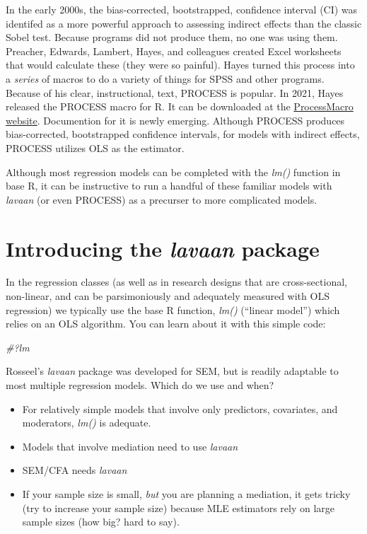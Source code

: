 \documentclass[
  english,
]{book}
\newenvironment{Shaded}{\begin{snugshade}}{\end{snugshade}}
\newcommand{\CommentTok}[1]{\textcolor[rgb]{0.56,0.35,0.01}{\textit{#1}}}
\providecommand{\tightlist}{%
  \setlength{\itemsep}{0pt}\setlength{\parskip}{0pt}}
\begin{document}
In the early 2000s, the bias-corrected, bootstrapped, confidence interval (CI) was identifed as a more powerful approach to assessing indirect effects than the classic Sobel test. Because programs did not produce them, no one was using them. Preacher, Edwards, Lambert, Hayes, and colleagues created Excel worksheets that would calculate these (they were so painful). Hayes turned this process into a \emph{series} of macros to do a variety of things for SPSS and other programs. Because of his clear, instructional, text, PROCESS is popular. In 2021, Hayes released the PROCESS macro for R. It can be downloaded at the \href{https://www.processmacro.org/download.html}{ProcessMacro website}. Documention for it is newly emerging. Although PROCESS produces bias-corrected, bootstrapped confidence intervals, for models with indirect effects, PROCESS utilizes OLS as the estimator.

Although most regression models can be completed with the \emph{lm()} function in base R, it can be instructive to run a handful of these familiar models with \emph{lavaan} (or even PROCESS) as a precurser to more complicated models.

\hypertarget{introducing-the-lavaan-package}{%
\section{\texorpdfstring{Introducing the \emph{lavaan} package}{Introducing the lavaan package}}\label{introducing-the-lavaan-package}}

In the regression classes (as well as in research designs that are cross-sectional, non-linear, and can be parsimoniously and adequately measured with OLS regression) we typically use the base R function, \emph{lm()} (``linear model'') which relies on an OLS algorithm. You can learn about it with this simple code:

\begin{Shaded}
\begin{Highlighting}[]
\CommentTok{\#?lm}
\end{Highlighting}
\end{Shaded}

Rosseel's \citeyearpar{rosseel_lavaan_2020} \emph{lavaan} package was developed for SEM, but is readily adaptable to most multiple regression models. Which do we use and when?

\begin{itemize}
\tightlist
\item
  For relatively simple models that involve only predictors, covariates, and moderators, \emph{lm()} is adequate.
\item
  Models that involve mediation need to use \emph{lavaan}
\item
  SEM/CFA needs \emph{lavaan}
\item
  If your sample size is small, \emph{but} you are planning a mediation, it gets tricky (try to increase your sample size) because MLE estimators rely on large sample sizes (how big? hard to say).
\end{itemize}
\end{document}
